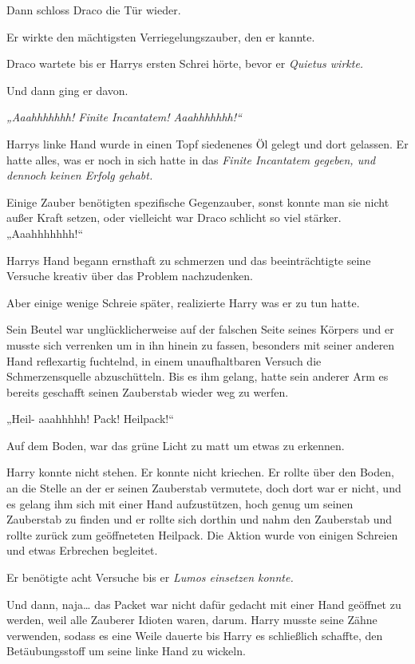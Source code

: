 {Dann schloss Draco die Tür wieder.

Er wirkte den mächtigsten Verriegelungszauber, den er kannte.

Draco wartete bis er Harrys ersten Schrei hörte, bevor er \emph{Quietus wirkte\emph{.}}

Und dann ging er davon.

\emph{„Aaahhhhhhh! Finite Incantatem! Aaahhhhhhh!“}

Harrys linke Hand wurde in einen Topf siedenenes Öl gelegt und dort gelassen. Er hatte alles, was er noch in sich hatte in das \emph{Finite Incantatem gegeben, und dennoch keinen Erfolg gehabt.}

Einige Zauber benötigten spezifische Gegenzauber, sonst konnte man sie nicht außer Kraft setzen, oder vielleicht war Draco schlicht so viel stärker.\\ „Aaahhhhhhh!“

Harrys Hand begann ernsthaft zu schmerzen und das beeinträchtigte seine Versuche kreativ über das Problem nachzudenken.

Aber einige wenige Schreie später, realizierte Harry was er zu tun hatte.

Sein Beutel war unglücklicherweise auf der falschen Seite seines Körpers und er musste sich verrenken um in ihn hinein zu fassen, besonders mit seiner anderen Hand reflexartig fuchtelnd, in einem unaufhaltbaren Versuch die Schmerzensquelle abzuschütteln. Bis es ihm gelang, hatte sein anderer Arm es bereits geschafft seinen Zauberstab wieder weg zu werfen.

„Heil- aaahhhhh! Pack! Heilpack!“

Auf dem Boden, war das grüne Licht zu matt um etwas zu erkennen.

Harry konnte nicht stehen. Er konnte nicht kriechen. Er rollte über den Boden, an die Stelle an der er seinen Zauberstab vermutete, doch dort war er nicht, und es gelang ihm sich mit einer Hand aufzustützen, hoch genug um seinen Zauberstab zu finden und er rollte sich dorthin und nahm den Zauberstab und rollte zurück zum geöffneteten Heilpack. Die Aktion wurde von einigen Schreien und etwas Erbrechen begleitet.

Er benötigte acht Versuche bis er \emph{Lumos einsetzen konnte.}

Und dann, naja… das Packet war nicht dafür gedacht mit einer Hand geöffnet zu werden, weil alle Zauberer Idioten waren, darum. Harry musste seine Zähne verwenden, sodass es eine Weile dauerte bis Harry es schließlich schaffte, den Betäubungsstoff um seine linke Hand zu wickeln.

}
